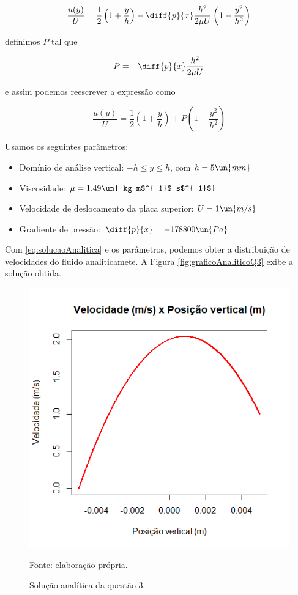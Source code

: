 \[ \frac{u(y)}{U} = \frac{1}{2} \left(1 + \frac{y}{h}\right) -  \diff{p}{x} \frac{h^2}{2\mu U} \left(1 -  \frac{y^2}{h^2} \right) \]

\noindent definimos $P$ tal que

\[ P = - \diff{p}{x}  \frac{h^2}{2\mu U} \]

\noindent e assim podemos reescrever a expressão como

\begin{equation}\label{eq:solucaoAnalitica}
    \frac{u(y)}{U} = \frac{1}{2} \left(1 + \frac{y}{h}\right) + P\left(1 - \frac{y^2}{h^2}\right) 
\end{equation}

Usamos os seguintes parâmetros:

\begin{itemize}
    \item Domínio de análise vertical: $-h \leq y \leq h$, com $h = 5 \un{mm}$
    \item Viscosidade: $\mu=1.49 \un{ kg m$^{-1}$ s$^{-1}$}$
    \item Velocidade de deslocamento da placa superior: $U=1 \un{m/s}$
    \item Gradiente de pressão: $\diff{p}{x} = -178800 \un{Pa}$
\end{itemize}

Com \eqref{eq:solucaoAnalitica} e os parâmetros, podemos obter a distribuição de velocidades
do fluido analiticamete. A Figura \eqref{fig:graficoAnaliticoQ3} exibe a solução obtida.

\begin{figure}[h!]
    \caption{Solução analítica da questão 3.}
    \label{fig:graficoAnaliticoQ3}
    \centering
    \centerline{\includegraphics[scale=0.7]{graficoAnaliticoQ3.png}}
    \par{Fonte: elaboração própria.}
\end{figure}

